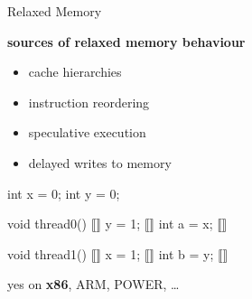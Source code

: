 \documentclass[aspectratio=169, fi]{paradise-slide}
\begin{document}
\begin{frame}[fragile]{Relaxed Memory}
  \begin{minipage}{0.47\textwidth}
    \textbf{sources of relaxed memory behaviour}
    \vspace{-1.3em}
    \begin{itemize}
      \item cache hierarchies
      \item instruction reordering
      \item speculative execution
      \item delayed writes to memory
    \end{itemize}
    \medskip
  \end{minipage}
  \hfill\pause
  \begin{minipage}{0.48\textwidth}
    \begin{cppcode}
      int x = 0;
      int y = 0;
    \end{cppcode}
    \begin{minipage}{0.49\textwidth}
      \begin{cppcode}
        void thread0()
        { ⟦⟧
          y = 1; ⟦⟧
          int a = x; ⟦⟧
        }
      \end{cppcode}
    \end{minipage}
    \hfill
    \begin{minipage}{0.49\textwidth}
      \begin{cppcode}
        void thread1()
        { ⟦⟧
          x = 1; ⟦⟧
          int b = y; ⟦⟧
        }
      \end{cppcode}
    \end{minipage}

  \end{minipage}

  \bigskip\bigskip\pause
  \begin{minipage}[t]{0.48\textwidth}
  \end{minipage}
  \hfill
  \begin{minipage}[t]{0.48\textwidth}
    yes on \textbf{x86}, ARM, POWER, …

  \end{minipage}
\end{frame}
\end{document}
